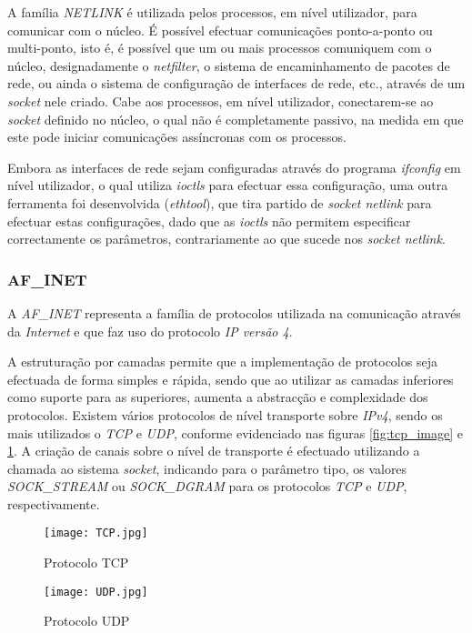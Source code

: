 A família \textit{NETLINK} é utilizada pelos processos, em nível utilizador, para comunicar com o núcleo.
É possível efectuar comunicações ponto-a-ponto ou multi-ponto, isto é, é possível que um ou mais processos comuniquem com o núcleo, designadamente o \textit{netfilter}, o sistema de encaminhamento de pacotes de rede, ou ainda o sistema de configuração de interfaces de rede, etc., através de um \textit{socket} nele criado.
Cabe aos processos, em nível utilizador, conectarem-se ao \textit{socket} definido no núcleo, o qual não é completamente passivo, na medida em que este pode iniciar comunicações assíncronas com os processos.

Embora as interfaces de rede sejam configuradas através do programa \textit{ifconfig} em nível utilizador, o qual utiliza \textit{ioctls} para efectuar essa configuração, uma outra ferramenta foi desenvolvida (\textit{ethtool}), que tira partido de \textit{socket netlink} para efectuar estas configurações, dado que as \textit{ioctls} não permitem especificar correctamente os parâmetros, contrariamente ao que sucede nos \textit{socket netlink}.

\subsubsection{AF\_INET}
\label{subsub:af_inet}

A \textit{AF\_INET} representa a família de protocolos utilizada na comunicação através da \textit{Internet} e que faz uso do protocolo \textit{IP versão 4}. %

A estruturação por camadas permite que a implementação de protocolos seja efectuada de forma simples e rápida, sendo que ao utilizar as camadas inferiores como suporte para as superiores, aumenta a abstracção e complexidade dos protocolos.\cite{TCP_IP}
Existem vários protocolos de nível transporte sobre \textit{IPv4}, sendo os mais utilizados o \textit{TCP} e \textit{UDP}, conforme evidenciado nas figuras \ref{fig:tcp_image} e \ref{fig:udp_image}.
A criação de canais sobre o nível de transporte é efectuado utilizando a chamada ao sistema \textit{socket}, indicando para o parâmetro tipo, os valores \textit{SOCK\_STREAM} ou \textit{SOCK\_DGRAM} para os protocolos \textit{TCP} e \textit{UDP}, respectivamente.

\begin{figure}[ht]
\begin{minipage}[b]{0.5\linewidth}
\centering
\texttt{[image: TCP.jpg]}
\caption{Protocolo TCP}
\label{fig:tcp_image}
\end{minipage}
\hspace{0.5cm}
\begin{minipage}[b]{0.5\linewidth}
\centering
\texttt{[image: UDP.jpg]}
\caption{Protocolo UDP}
\label{fig:udp_image}
\end{minipage}
\end{figure}

